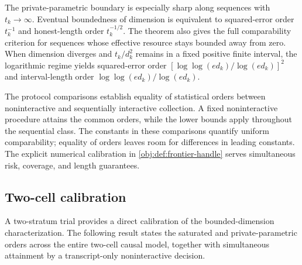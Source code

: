 The private-parametric boundary is especially sharp along sequences with \(t_k\to\infty\). Eventual boundedness of dimension is equivalent to squared-error order \(t_k^{-1}\) and honest-length order \(t_k^{-1/2}\). The theorem also gives the full comparability criterion for sequences whose effective resource stays bounded away from zero. When dimension diverges and \(t_k/d_k^2\) remains in a fixed positive finite interval, the logarithmic regime yields squared-error order \([\log\log(ed_k)/\log(ed_k)]^2\) and interval-length order \(\log\log(ed_k)/\log(ed_k)\).

The protocol comparisons establish equality of statistical orders between noninteractive and sequentially interactive collection. A fixed noninteractive procedure attains the common orders, while the lower bounds apply throughout the sequential class. The constants in these comparisons quantify uniform comparability; equality of orders leaves room for differences in leading constants. The explicit numerical calibration in \cref{obj:def:frontier-handle} serves simultaneous risk, coverage, and length guarantees.

\subsection{Two-cell calibration}

A two-stratum trial provides a direct calibration of the bounded-dimension characterization. The following result states the saturated and private-parametric orders across the entire two-cell causal model, together with simultaneous attainment by a transcript-only noninteractive decision.

